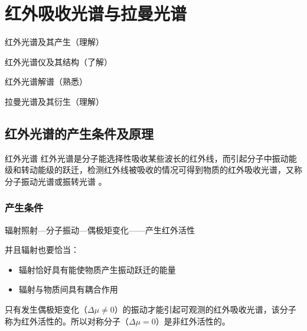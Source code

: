 \chapter{红外吸收光谱与拉曼光谱}
\begin{introduction}
    \item 红外光谱及其产生（理解）
    \item 红外光谱仪及其结构（了解）
    \item 红外光谱解谱（熟悉）
    \item 拉曼光谱及其衍生（理解）
\end{introduction}
\section{红外光谱的产生条件及原理}
\begin{definition*}{红外光谱}
    红外光谱是分子能选择性吸收某些波长的红外线，而引起分子中振动能级和转动能级的跃迁，检测红外线被吸收的情况可得到物质的红外吸收光谱，又称分子振动光谱或振转光谱 。
\end{definition*}
\subsection{产生条件}
辐射照射---分子振动---偶极矩变化------产生红外活性

并且辐射也要恰当：
\begin{itemize}
    \item 辐射恰好具有能使物质产生振动跃迁的能量
    \item 辐射与物质间具有耦合作用
\end{itemize}
\begin{note}
    只有发生偶极矩变化（$\Delta \mu \neq 0$）的振动才能引起可观测的红外吸收光谱，该分子称为红外活性的。所以对称分子（$\Delta \mu=0$）是非红外活性的。
\end{note}
